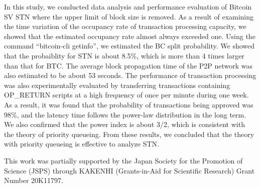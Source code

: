 \documentclass[graybox]{svmult}
\begin{document}
In this study, we conducted data analysis and performance evaluation of Bitcoin SV STN where the upper limit of block size is removed. 
As a result of examining the time variation of the occupancy rate of transaction processing capacity, we showed that the estimated occupancy rate almost always exceeded one. 
Using the command ``bitcoin-cli getinfo'', we estimated the BC split probability. 
We showed that the probaiblity for STN is about 8.5\%, which is more than 4 times larger than that for BTC.
The average block propagation time of the P2P network was also estimated to be about 53 seconds.
The performance of transaction processing was also experimentally evaluated by transferring transactions containing OP\_RETURN scripts at a high frequency of once per minute during one week.
As a result, it was found that the probability of transactions being approved was 98\%, and the latency time follows the power-law distribution in the long term. 
We also confirmed that the power index is about 3/2, which is consistent with the theory of priority queueing.
From these results, we concluded that the theory with priority queueing is effective to analyze STN. 



\begin{acknowledgement}
 This work was partially supported by the Japan Society for the Promotion of 
Science (JSPS) through KAKENHI (Grants-in-Aid for Scientific Research) Grant 
Number 20K11797. 
\end{acknowledgement}



\end{document}
